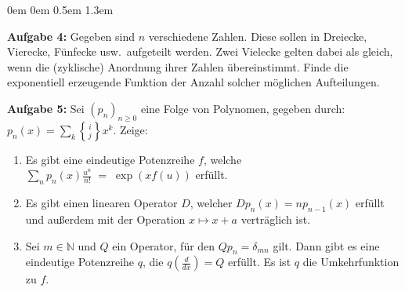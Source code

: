 \documentclass[a4paper,ngerman]{scrartcl}
\theoremstyle{definition}
\theoremstyle{plain}
\theoremstyle{remark}
\begin{document}
\begin{list}{}{0em \leftmargin0em \itemindent0.5em \itemsep 1.3em}
\item[\textbf{Aufgabe 4: }] Gegeben sind $n$ verschiedene Zahlen. Diese sollen in Dreiecke, Vierecke, Fünfecke usw.~aufgeteilt werden. Zwei Vielecke gelten dabei als gleich, wenn die (zyklische) Anordnung ihrer Zahlen übereinstimmt. Finde die exponentiell erzeugende Funktion der Anzahl solcher möglichen Aufteilungen.

\item[\textbf{Aufgabe 5: }] Sei $(p_n)_{n\geq 0}$ eine Folge von Polynomen, gegeben durch: $p_n(x) = \sum_k\genfrac\{\}{0pt}{}{i}{j}x^k$. Zeige:
\begin{enumerate}
\item Es gibt eine eindeutige Potenzreihe $f$, welche
$ \sum_n p_n(x)\frac{u^n}{n!} \; =\; \exp(xf(u))
$ erfüllt.
\item Es gibt einen linearen Operator $D$, welcher $Dp_n(x) = np_{n-1}(x)$ erfüllt und außerdem mit der Operation $x\mapsto x+a$ verträglich ist.
\item Sei $m\in\mathbb{N}$ und $Q$ ein Operator, für den $Qp_n = \delta_{mn}$ gilt. Dann gibt es eine eindeutige Potenzreihe $q$, die $q(\frac{d}{dx}) = Q$ erfüllt. Es ist $q$ die Umkehrfunktion zu $f$.
\end{enumerate}
\end{list}
\end{document}
